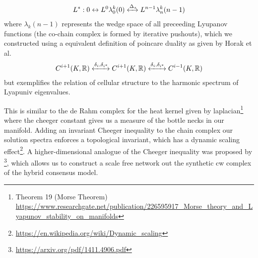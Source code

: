 \documentclass{article}
\begin{document}
\begin{equation} \label{eq1}
\begin{split}
L^* : 0 \leftrightarrow L^0 \lambda^k_0(0) \xleftrightarrow{\Delta_s} L^{n-1} \lambda^{k}_n(n-1)
\end{split}
\end{equation}
where $\lambda_k(n-1)$ represents the wedge space of all preceeding Lyupanov functions (the co-chain complex is formed by iterative pushouts), which we constructed using a equivalent definition of poincare duality as given by Horak et al.
\begin{equation} \label{eq1}
\begin{split}
C^{i+1}(K, \mathbb{R})  \xleftrightarrow{\delta_i, \delta_{i^*}} C^{i+1}(K, \mathbb{R}) \xleftrightarrow{\delta_i, \delta_{i^*}}  C^{i-1}(K, \mathbb{R})
\end{split}
\end{equation}
but exemplifies the relation of cellular structure to the harmonic spectrum of Lyapuniv eigenvalues.

This is similar to the de Rahm complex for the heat kernel given by laplacian\footnote{Theorem 19 (Morse Theorem) \url{https://www.researchgate.net/publication/226595917_Morse_theory_and_Lyapunov_stability_on_manifolds}} where the cheeger constant gives us a measure of the bottle necks in our manifold. Adding an invariant Cheeger inequality to the chain complex our solution spectra enforces a topological invariant, which has a dynamic scaling effect\footnote{\url{https://en.wikipedia.org/wiki/Dynamic_scaling}}. A higher-dimensional analogue of the Cheeger inequality was proposed by \footnote{\url{https://arxiv.org/pdf/1411.4906.pdf}}, which allows us to construct a scale free network out the synthetic cw complex of the hybrid consensus model. 
\end{document}
